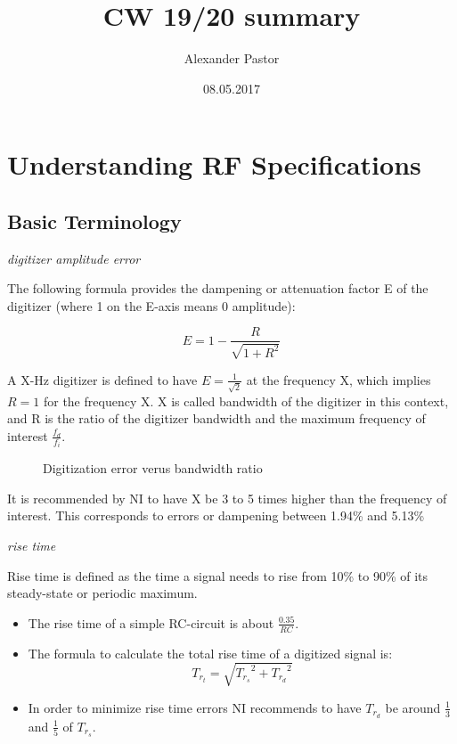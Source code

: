 \documentclass{article}
\begin{document}
\title{CW 19/20 summary}
\author{Alexander Pastor}
\date{08.05.2017}
\maketitle
\tableofcontents
\newpage

\section{Understanding RF Specifications}

\subsection{Basic Terminology}

\emph{digitizer amplitude error}

The following formula provides the dampening or attenuation factor E of the digitizer (where 1 on the E-axis means 0 amplitude):

\begin{equation}
	E = 1- \frac{R}{\sqrt{1+R^2}}
\end{equation}

\medskip

A X-Hz digitizer is defined to have $ E = \frac{1}{\sqrt{2}}$ at the frequency X, which implies $R=1$ for the frequency X. X is called bandwidth of the digitizer in this context, and R is the ratio of the digitizer bandwidth and the maximum frequency of interest $\frac{f_d}{f_i}$.

\begin{figure}[h]
	\centering
	\label{amplitude_error}
	
	\caption{Digitization error verus bandwidth ratio}
\end{figure}

It is recommended by NI to have X be 3 to 5 times higher than the frequency of interest. This corresponds to errors or dampening between 1.94\% and 5.13\% 

\bigskip

\emph{rise time}

Rise time is defined as the time a signal needs to rise from 10\% to 90\% of its steady-state or periodic maximum.

\bigskip

\begin{itemize}
	\item The rise time of a simple RC-circuit is about $\frac{0.35}{RC}$.
	\item The formula to calculate the total rise time of a digitized signal is: $$ T_{r_t} = \sqrt{{T_{r_s}}^2 + {T_{r_d}}^2}$$
	\item In order to minimize rise time errors NI recommends to have $T_{r_d}$ be around $\frac{1}{3}$ and $\frac{1}{5}$ of $T_{r_s}$.
\end{itemize}
\end{document}
